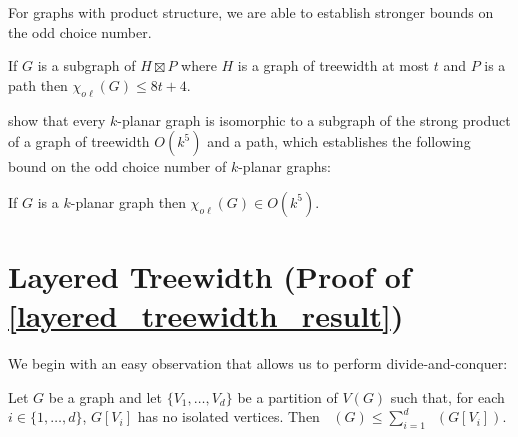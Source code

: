 \documentclass{patmorin}
\DeclareMathOperator{\odd}{\chi_o}
\newcommand{\oddc}{\chi_{o\ell}}
\begin{document}
For graphs with product structure, we are able to establish stronger bounds on the odd choice number.

\begin{thm}\label{product_structure_result}
  If $G$ is a subgraph of $H\boxtimes P$ where $H$ is a graph of treewidth at most $t$ and $P$ is a path then $\oddc(G)\le 8t+4$.
\end{thm}

\citet[Theorem 2]{dujmovic.morin.ea:structure} show that every $k$-planar graph is isomorphic to a subgraph of the strong product of a graph of treewidth $O(k^5)$ and a path, which establishes the following bound on the odd choice number of $k$-planar graphs:

\begin{cor}\label{k_planar_choice}
  If $G$ is a $k$-planar graph then $\oddc(G)\in O(k^5)$.
\end{cor}


%
%
%
%

\section{Layered Treewidth (Proof of \cref{layered_treewidth_result})}
\label{layered_treewidth}

We begin with an easy observation that allows us to perform divide-and-conquer:

\begin{obs}\label{partition}
  Let $G$ be a graph and let $\{V_1,\ldots,V_d\}$ be a partition of $V(G)$ such that, for each $i\in\{1,\ldots,d\}$, $G[V_i]$ has no isolated vertices.  Then $\odd(G) \le \sum_{i=1}^d \odd(G[V_i])$.
\end{obs}
\end{document}
